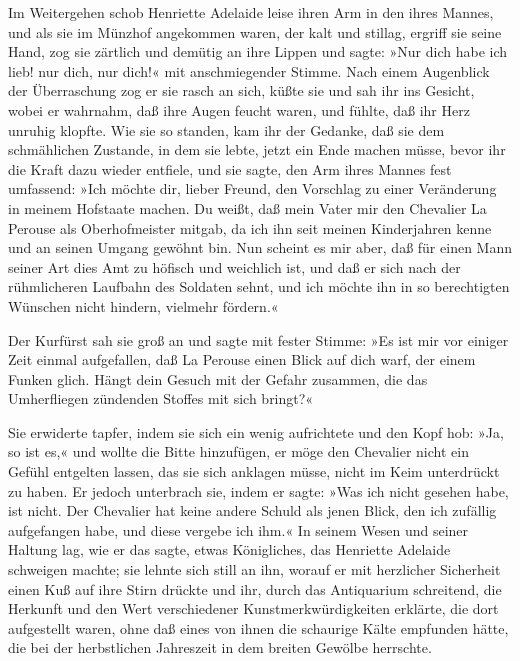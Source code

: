 Im Weitergehen schob Henriette Adelaide leise ihren Arm in den
ihres Mannes, und als sie im Münzhof angekommen waren, der kalt und
stillag, ergriff sie seine Hand, zog sie zärtlich und demütig an
ihre Lippen und sagte: »Nur dich habe ich lieb! nur dich, nur
dich!« mit anschmiegender Stimme. Nach einem Augenblick der
Überraschung zog er sie rasch an sich, küßte sie und sah ihr ins
Gesicht, wobei er wahrnahm, daß ihre Augen feucht waren, und
fühlte, daß ihr Herz unruhig klopfte. Wie sie so standen, kam ihr
der Gedanke, daß sie dem schmählichen Zustande, in dem sie lebte,
jetzt ein Ende machen müsse, bevor ihr die Kraft dazu wieder
entfiele, und sie sagte, den Arm ihres Mannes fest umfassend: »Ich
möchte dir, lieber Freund, den Vorschlag zu einer Veränderung in
meinem Hofstaate machen. Du weißt, daß mein Vater mir den
\pagenum{[119]} Chevalier La Perouse als Oberhofmeister mitgab, da
ich ihn seit meinen Kinderjahren kenne und an seinen Umgang gewöhnt
bin. Nun scheint es mir aber, daß für einen Mann seiner Art dies
Amt zu höfisch und weichlich ist, und daß er sich nach der
rühmlicheren Laufbahn des Soldaten sehnt, und ich möchte ihn in so
berechtigten Wünschen nicht hindern, vielmehr fördern.«

Der Kurfürst sah sie groß an und sagte mit fester Stimme: »Es ist
mir vor einiger Zeit einmal aufgefallen, daß La Perouse einen Blick
auf dich warf, der einem Funken glich. Hängt dein Gesuch mit der
Gefahr zusammen, die das Umherfliegen zündenden Stoffes mit sich
bringt?«

Sie erwiderte tapfer, indem sie sich ein wenig aufrichtete und den
Kopf hob: »Ja, so ist es,« und wollte die Bitte hinzufügen, er möge
den Chevalier nicht ein Gefühl entgelten lassen, das sie sich
anklagen müsse, nicht im Keim unterdrückt zu haben. Er jedoch
unterbrach sie, indem er sagte: »Was ich nicht gesehen habe, ist
nicht. Der Chevalier hat keine andere Schuld als jenen Blick, den
ich zufällig aufgefangen habe, und diese vergebe ich ihm.« In
seinem Wesen und seiner Haltung lag, wie er das sagte, etwas
Königliches, das Henriette Adelaide schweigen machte; sie lehnte
sich still an ihn, worauf er mit herzlicher Sicherheit einen Kuß
auf ihre Stirn drückte und ihr, durch das Antiquarium schreitend,
die Herkunft und den Wert verschiedener Kunstmerkwürdigkeiten
erklärte, die dort aufgestellt waren, ohne daß eines von ihnen die
schaurige Kälte empfunden hätte, die bei der herbstlichen
Jahreszeit in dem breiten Gewölbe herrschte.

